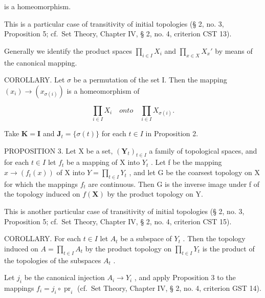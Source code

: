 is a homeomorphism.

This is a particular case of transitivity of initial topologies (§ 2, no. 3, Proposition 5; cf.~Set Theory, Chapter IV, § 2, no. 4, criterion CST 13).

Generally we identify the product spaces \(\prod_{i\in I}X_i\) and \(\prod_{x\in X}X_x'\) by means of the canonical mapping.

COROLLARY. Let \(\sigma\) be a permutation of the set I. Then the mapping \((x_{i})\to (x_{\sigma(i)})\) is a homeomorphism of

\[
\prod_ {i \in I} X _ {i} \quad onto \quad \prod_ {i \in I} X _ {\sigma (i)}.
\]

Take \(\mathbf{K} = \mathbf{I}\) and \(\mathbf{J}_t = \{\sigma(t)\}\) for each \(t \in I\) in Proposition 2.

PROPOSITION 3. Let X be a set, \((\mathbf{Y}_{t})_{t\in I}\) a family of topological spaces, and for each \(t\in I\) let \(f_{t}\) be a mapping of X into \(Y_{t}\) . Let f be the mapping \(x\to(f_{t}(x))\) of X into \(Y=\prod_{t\in I}Y_{t}\) , and let G be the coarsest topology on X for which the mappings \(f_{t}\) are continuous. Then G is the inverse image under f of the topology induced on \(f(\mathbf{X})\) by the product topology on Y.

This is another particular case of transitivity of initial topologies (§ 2, no. 3, Proposition 5; cf.~Set Theory, Chapter IV, § 2, no. 4, criterion CST 15).

COROLLARY. For each \(t \in I\) let \(A_{t}\) be a subspace of \(Y_{t}\) . Then the topology induced on \(A = \prod_{t \in I} A_{t}\) by the product topology on \(\prod_{t \in I} Y_{t}\) is the product of the topologies of the subspaces \(A_{t}\) .

Let \(j_{i}\) be the canonical injection \(A_{i} \to Y_{i}\) , and apply Proposition 3 to the mappings \(f_{i} = j_{i} \circ \operatorname{pr}_{i}\) (cf.~Set Theory, Chapter IV, § 2, no. 4, criterion GST 14).

